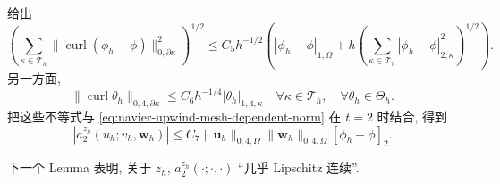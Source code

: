 \begin{Proof}
给出
\[
\left(\sum_{\kappa\in\mathcal T_h}
\|\operatorname{curl}(\phi_h-\phi)\|_{0,\partial\kappa}^2\right)^{1/2}
\leq C_5h^{-1/2}\left(
|\phi_h-\phi|_{1,\Omega}
+h\left(\sum_{\kappa\in\mathcal T_h}|\phi_h-\phi|_{2,\kappa}^2\right)^{1/2}
\right).
\]
另一方面,
\[
\|\operatorname{curl}\theta_h\|_{0,4,\partial\kappa}
\leq C_6h^{-1/4}|\theta_h|_{1,4,\kappa}
\quad\forall\kappa\in\mathcal T_h,
\quad\forall\theta_h\in\Theta_h.
\]
把这些不等式与 \eqref{eq:navier-upwind-mesh-dependent-norm} 在 $t=2$ 时结合, 得到
\begin{equation}\label{eq:navier-upwind-boundary-form-estimate}
|a_2^{z_h}(u_h;v_h,\boldsymbol w_h)|
\leq C_7\|\boldsymbol u_h\|_{0,4,\Omega}
\|\boldsymbol w_h\|_{0,4,\Omega}[\phi_h-\phi]_2.
\end{equation}
\end{Proof}

下一个 Lemma 表明, 关于 $z_h$,
$a_2^{z_h}(\mathord\cdot;\mathord\cdot,\mathord\cdot)$ ``几乎 Lipschitz 连续''.

